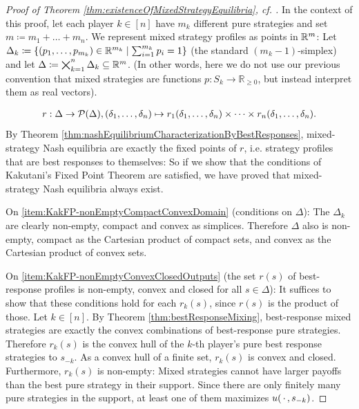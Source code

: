 \documentclass[a4paper,DIV=11]{scrreprt}
\newcommand{\Rp}{\mathbb{R}_{\geq 0}}
\theoremstyle{definition}
\begin{document}
    \begin{proof}[Proof of Theorem \ref{thm:existenceOfMixedStrategyEquilibria}, cf. {\cite[p.29]{bib:fudenbergGameTheory}}]
        In the context of this proof, let each player $k \in [n]$ have $m_k$ different pure strategies and set $m \coloneqq m_1 + \dots + m_n$.
        We represent mixed strategy profiles as points in $\mathbb{R}^m$: Let $\Delta_k \coloneqq \{(p_1, \dots, p_{m_k}) \in \mathbb{R}^{m_k} \mid \sum_{i=1}^{m_k} p_i = 1\}$ (the standard $(m_k - 1)$-simplex) and let $\Delta \coloneqq \bigtimes_{k=1}^n \Delta_k \subseteq \mathbb{R}^m$. (In other words, here we do not use our previous convention that mixed strategies are functions $p: S_k \to \Rp$, but instead interpret them as real vectors).
        
        \begin{gather}
            r: \Delta \to \operatorname{\mathcal{P}}(\Delta), (\delta_1, \dots, \delta_n) \mapsto r_1(\delta_1, \dots, \delta_n) \times \dots \times r_n(\delta_1, \dots, \delta_n).
            \label{eq:bestResponseCorresponenceDefinition}
        \end{gather}
        By Theorem \ref{thm:nashEquilibriumCharacterizationByBestResponses}, mixed-strategy Nash equilibria are exactly the fixed points of $r$, i.e. strategy profiles that are best responses to themselves: So if we show that the conditions of Kakutani's Fixed Point Theorem are satisfied, we have proved that mixed-strategy Nash equilibria always exist.
        
        On \ref{item:KakFP-nonEmptyCompactConvexDomain} (conditions on $\Delta$): The $\Delta_k$ are clearly non-empty, compact and convex as simplices. Therefore $\Delta$ also is non-empty,
        compact as the Cartesian product of compact sets, and convex as the Cartesian product of convex sets. %
        
        On \ref{item:KakFP-nonEmptyConvexClosedOutputs} (the set $r(s)$ of best-response profiles is non-empty, convex and closed for all $s \in \Delta$): It suffices to show that these conditions hold for each $r_k(s)$, since $r(s)$ is the product of those. Let $k \in [n]$. By Theorem \ref{thm:bestResponseMixing}, best-response mixed strategies are exactly the convex combinations of best-response pure strategies. Therefore $r_k(s)$ is the convex hull of the $k$-th player's pure best response strategies to $s_{-k}$. As a convex hull of a finite set, $r_k(s)$ is convex and closed.
        Furthermore, $r_k(s)$ is non-empty: Mixed strategies cannot have larger payoffs than the best pure strategy in their support. Since there are only finitely many pure strategies in the support, at least one of them maximizes $u(\,\cdot\,, s_{-k})$.
        

\end{proof}
\end{document}
